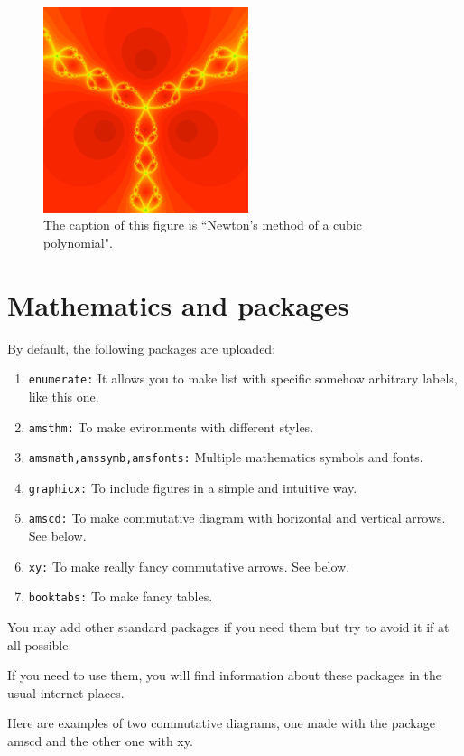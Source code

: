 \documentclass[12,twoside]{TFG-GM}
\theoremstyle{definition}
\theoremstyle{remark}
\begin{document}
\begin{figure}[htb!]
\begin{center}
\includegraphics[width=6cm]{samplefigure.pdf}
\end{center}
\caption{\label{sample figure} \small The caption of this figure is ``Newton's method of a cubic polynomial".}
\end{figure}

\section{Mathematics and packages} \label{packages}

By default, the following packages are uploaded:
\begin{enumerate}[\bf (1)]
\item {\tt enumerate:} It allows you to make list with specific somehow arbitrary labels, like this one.
\item {\tt amsthm:} To make evironments with different styles.
\item {\tt amsmath,amssymb,amsfonts:} Multiple mathematics symbols and fonts.
\item {\tt graphicx:} To include figures in a simple and intuitive way.
\item {\tt amscd:} To make commutative diagram with horizontal and vertical arrows. See below.
\item {\tt xy:} To make really fancy commutative arrows. See below.
\item {\tt booktabs:} To make fancy tables.
\end{enumerate}
You may add other standard packages if you need them but try to avoid it if at all possible.

If you need to use them, you will find information about these packages in the usual internet places. 

Here are examples of two commutative diagrams, one made with the package amscd and the other one with xy.
\end{document}
